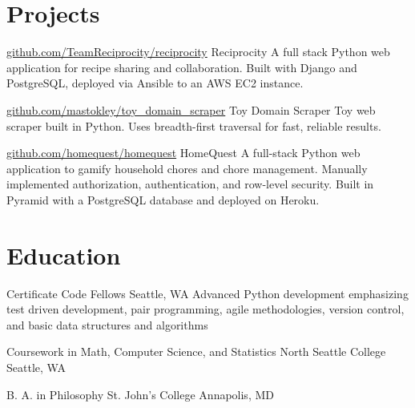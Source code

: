 \documentclass[10pt,a4paper,sans]{moderncv}        %
\begin{document}
\section{Projects}

\begin{comment}

  \cventry
  {date}
  {github url}
  {name}
  {}
  {}
  {description}

\end{comment}

 {\href{http://github.com/TeamReciprocity/reciprocity}{github.com/TeamReciprocity/reciprocity}} {Reciprocity} {} {} {A full stack Python web application for recipe sharing and collaboration. Built with Django and PostgreSQL, deployed via Ansible to an AWS EC2 instance.}

 {\href{https://github.com/mastokley/toy_domain_scraper}{github.com/mastokley/toy\_domain\_scraper}} {Toy Domain Scraper} {} {} {Toy web scraper built in Python. Uses breadth-first traversal for fast, reliable results.}

 {\href{https://github.com/homequest/homequest}{github.com/homequest/homequest}} {HomeQuest} {} {} {A full-stack Python web application to gamify household chores and chore management. Manually implemented authorization, authentication, and row-level security. Built in Pyramid with a PostgreSQL database and deployed on Heroku.}

\section{Education}
 {Certificate} {Code Fellows} {Seattle, WA} {} {Advanced Python development emphasizing test driven development, pair programming, agile methodologies, version control, and basic data structures and algorithms}

 {Coursework in Math, Computer Science, and Statistics}
{North Seattle College} {Seattle, WA} {} {}

 {B. A. in Philosophy} {St. John's College}
{Annapolis, MD} {} {}
\end{document}
